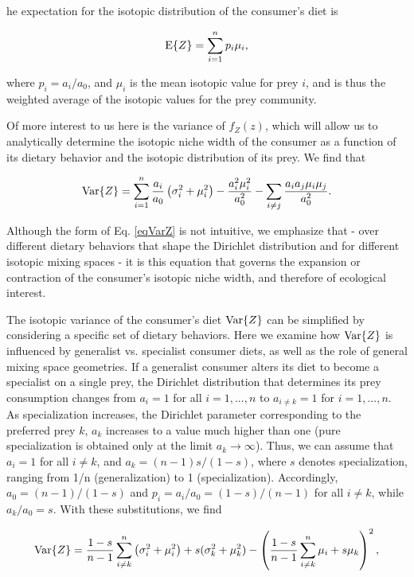 \documentclass[11pt]{article}
\begin{document}
he expectation for the isotopic distribution of the consumer's diet is

\begin{equation}
\label{eqEZ}
  {\rm E}\{Z\} = \sum_{i=1}^n p_i \mu_i,
\end{equation}

\noindent where $p_i = a_i/a_0$, and $\mu_i$ is the mean isotopic value for prey $i$, and is thus the weighted average of the isotopic values for the prey community.

Of more interest to us here is the variance of $f_Z(z)$, which will allow us to analytically determine the isotopic niche width of the consumer as a function of its dietary behavior and the isotopic distribution of its prey.
We find that

\begin{equation}
\label{eqVarZ}
  {\rm Var}\{Z\} = \sum_{i=1}^n \frac{a_i}{a_0}\left(\sigma_i^2 + \mu_i^2\right) - \frac{a_i^2\mu_i^2}{a_0^2}-\sum_{i \neq j}\frac{a_i a_j \mu_i \mu_j}{a_0^2}.
\end{equation}

\noindent Although the form of Eq. \ref{eqVarZ} is not intuitive, we emphasize that - over different dietary behaviors that shape the Dirichlet distribution and for different isotopic mixing spaces - it is this equation that governs the expansion or contraction of the consumer's isotopic niche width, and therefore of ecological interest.

The isotopic variance of the consumer's diet ${\rm Var}\{Z\}$ can be simplified by considering a specific set of dietary behaviors.
Here we examine how ${\rm Var}\{Z\}$ is influenced by generalist vs. specialist consumer diets, as well as the role of general mixing space geometries.
If a generalist consumer alters its diet to become a specialist on a single prey, the Dirichlet distribution that determines its prey consumption changes from $a_i=1$ for all $i=1,...,n$ to $a_{i \neq k}=1$ for $i=1,...,n$.
As specialization increases, the Dirichlet parameter corresponding to the preferred prey $k$, $a_k$ increases to a value much higher than one (pure specialization is obtained only at the limit $a_k \to \infty$).
Thus, we can assume that $a_i=1$ for all $i \neq k$, and $a_k = (n-1)s/(1-s)$, where $s$ denotes specialization, ranging from 1/n (generalization) to 1 (specialization).
Accordingly, $a_0 = (n-1)/(1-s)$ and $p_i = a_i/a_0 = (1-s)/(n-1)$ for all $i \neq k$, while $a_k/a_0 = s$.
With these substitutions, we find

\begin{equation}
\label{eqVarZs}
{\rm Var}\{Z\} = \frac{1-s}{n-1}\sum_{i \neq k}^n \left(\sigma_i^2 + \mu_i^2\right) + s(\sigma_k^2 + \mu_k^2) - \left(\frac{1-s}{n-1}\sum_{i \neq k}^n \mu_i + s\mu_k \right)^2,
\end{equation}
\end{document}
